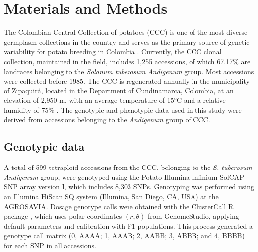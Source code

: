 \documentclass[pdflatex,sn-mathphys-ay]{sn-jnl}%
\begin{document}
\section{Materials and Methods}

The Colombian Central Collection of potatoes (CCC) is one of the most diverse germplasm collections in the country and serves as the primary source of genetic variability for potato breeding in Colombia \citep{manrique2023defining}. Currently, the CCC clonal collection, maintained in the field, includes 1,255 accessions, of which 67.17\% are landraces belonging to the \textit{Solanum tuberosum} \textit{Andigenum} group. Most accessions were collected before 1985. The CCC is regenerated annually in the municipality of Zipaquirá, located in the Department of Cundinamarca, Colombia, at an elevation of 2,950 m, with an average temperature of 15°C and a relative humidity of 75\% \citep{Berdugo2017}. The genotypic and phenotypic data used in this study were derived from accessions belonging to the \textit{Andigenum} group of CCC.






\subsection{Genotypic data}


A total of 599 tetraploid accessions from the CCC, belonging to the \textit{S. tuberosum Andigenum} group, were genotyped \citep{Berdugo2017} using the Potato Illumina Infinium SolCAP SNP array version I, which includes 8,303 SNPs. Genotyping was performed using an Illumina HiScan SQ system (Illumina, San Diego, CA, USA) at the AGROSAVIA. Dosage genotype calls were obtained with the ClusterCall R package \citep{Schmitz2017}, which uses polar coordinates $(r,\theta)$ from GenomeStudio, applying default parameters and calibration with F1 populations. This process generated a genotype call matrix (0, AAAA; 1, AAAB; 2, AABB; 3, ABBB; and 4, BBBB) for each SNP in all accessions.
\end{document}
